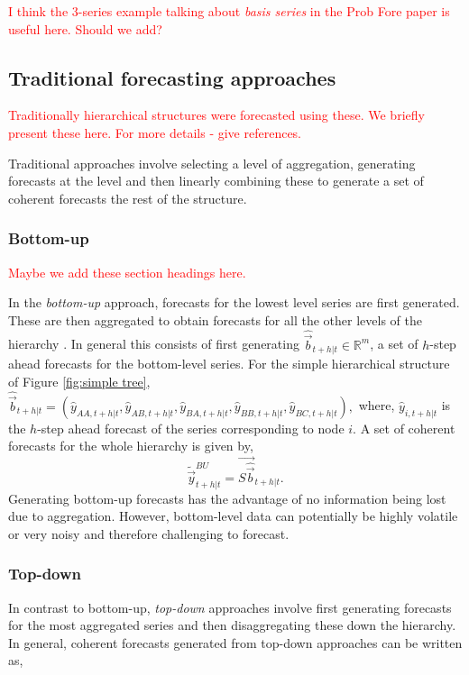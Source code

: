 \documentclass[graybox]{svmult}
\begin{document}
\textcolor{red}{I think the 3-series example talking about \textit{basis series} in the Prob Fore paper is useful here. Should we add?}


\subsection{Traditional forecasting approaches}
\textcolor{red}{Traditionally hierarchical structures were forecasted using these. We briefly present these here. For more details - give references.}

Traditional approaches involve selecting a level of aggregation, generating forecasts at the level and then linearly combining these to generate a set of coherent forecasts the rest of the structure.

\subsubsection{Bottom-up}
\textcolor{red}{Maybe we add these section headings here.}

In the \textit{bottom-up} approach, forecasts for the lowest level series are first generated. These are then aggregated to obtain forecasts for all the other levels of the hierarchy \citep{dunn1976}. In general this consists of first generating $\hat{\vec{b}}_{t+h|t} \in \mathbb{R}^m$, a set of $h$-step ahead forecasts for the bottom-level series. For the simple hierarchical structure of Figure \ref{fig:simple tree}, $\hat{\vec{b}}_{t+h|t} = (\hat{{y}}_{AA,t+h|t}, \hat{{y}}_{AB,t+h|t}, \hat{{y}}_{BA,t+h|t}, \hat{{y}}_{BB,t+h|t},\hat{{y}}_{BC,t+h|t}),$ where, $\hat{{y}}_{i,t+h|t}$ is the $h$-step ahead forecast of the series corresponding to node $i$. A set of coherent forecasts for the whole hierarchy is given by,
\begin{equation*}\label{eq:BU}
\tilde{\vec{y}}^{BU}_{t+h|t}=\vec{S\hat{\vec{b}}}_{t+h|t}.
\end{equation*}
Generating bottom-up forecasts has the advantage of no information being lost due to aggregation. However, bottom-level data can potentially be highly volatile or very noisy and therefore challenging to forecast.

\subsubsection{Top-down}

In contrast to bottom-up, \textit{top-down} approaches involve first generating forecasts for the most aggregated series and then disaggregating these down the hierarchy. In general, coherent forecasts generated from top-down approaches can be written as,
\end{document}
